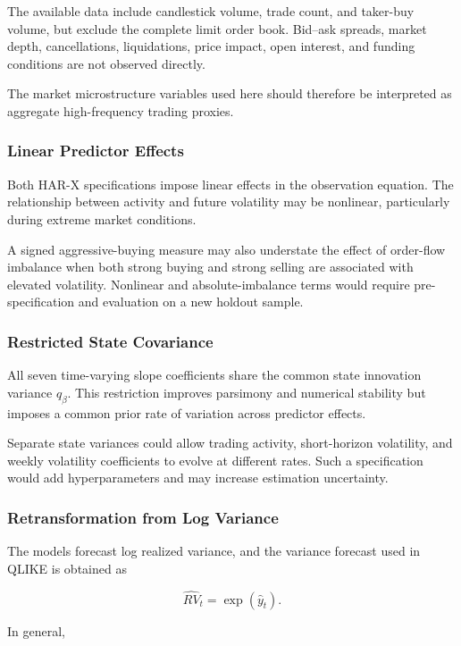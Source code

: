 The available data include candlestick volume, trade count, and
taker-buy volume, but exclude the complete limit order book.
Bid--ask spreads, market depth, cancellations, liquidations,
price impact, open interest, and funding conditions are not
observed directly.

The market microstructure variables used here should therefore
be interpreted as aggregate high-frequency trading proxies.

\subsubsection{Linear Predictor Effects}

Both HAR-X specifications impose linear effects in the
observation equation. The relationship between activity and
future volatility may be nonlinear, particularly during
extreme market conditions.

A signed aggressive-buying measure may also understate the
effect of order-flow imbalance when both strong buying and
strong selling are associated with elevated volatility.
Nonlinear and absolute-imbalance terms would require
pre-specification and evaluation on a new holdout sample.

\subsubsection{Restricted State Covariance}

All seven time-varying slope coefficients share the common
state innovation variance \(q_{\beta}\). This restriction
improves parsimony and numerical stability but imposes a common
prior rate of variation across predictor effects.

Separate state variances could allow trading activity,
short-horizon volatility, and weekly volatility coefficients
to evolve at different rates. Such a specification would add
hyperparameters and may increase estimation uncertainty.

\subsubsection{Retransformation from Log Variance}

The models forecast log realized variance, and the variance
forecast used in QLIKE is obtained as

\[
\widehat{RV}_t
=
\exp
\left(
\widehat{y}_t
\right).
\]

In general,

